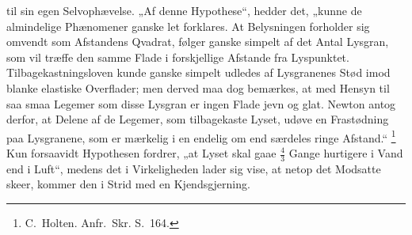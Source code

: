 \documentclass[12pt]{book}
\begin{document}
til sin egen Selvophævelse. „Af denne Hypothese“, hedder det, „kunne de almindelige
Phænomener ganske let forklares. At Belysningen forholder sig omvendt som Afstandens Qvadrat,
følger ganske simpelt af det Antal Lysgran, som vil træffe den samme Flade i forskjellige
Afstande fra Lyspunktet. Tilbagekastningsloven kunde ganske simpelt udledes af Lysgranenes
Stød imod blanke elastiske Overflader; men derved maa dog bemærkes, at med Hensyn til saa
smaa Legemer som disse Lysgran er ingen Flade jevn og glat. Newton antog derfor, at Delene af
de Legemer, som tilbagekaste Lyset, udøve en Frastødning paa Lysgranene, som er mærkelig i en
endelig om end særdeles ringe Afstand.“%
\footnote{C.\ Holten. Anfr.\ Skr. S.~164.}
Kun forsaavidt Hypothesen fordrer, „at Lyset skal gaae $\frac{4}{3}$ Gange hurtigere i Vand
end i Luft“, medens det i Virkeligheden lader sig vise, at netop det Modsatte skeer, kommer
den i Strid med en Kjendsgjerning.
\end{document}
